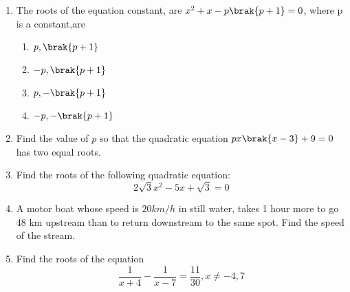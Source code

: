 \begin{enumerate}
    \item The roots of the equation constant, are $x^2+x-p\brak{p+1}=0$, where p is a constant,are
        \begin{enumerate}
            \item $p,\brak{p+1}$
            \item $-p,\brak{p+1}$
            \item $p,-\brak{p+1}$
            \item $-p,-\brak{p+1}$
        \end{enumerate}
    \item Find the value of $p$ so that the quadratic equation $px\brak{x-3}+9=0$ has two equal roots.
    \item Find the roots of the following quadratic equation:\[2\sqrt{3}x^2-5x+\sqrt{3}=0\]
    \item A motor boat whose speed is $20$$km/h$ in still water, takes 1 hour more to go 48 km upstream than to return downstream to the same spot. Find the speed of the stream.    
    \item Find the roots of the equation \[\dfrac{1}{x+4}-\dfrac{1}{x-7}=\dfrac{11}{30}, x\neq -4,7\] 
\end{enumerate}
